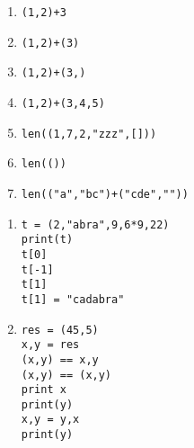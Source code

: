 \begin{multicols}{2}
\begin{multicols}{2}
  \begin{enumerate}[label=\emph{\alph*)}]
    \item \texttt{(1,2)+3}
    \item \texttt{(1,2)+(3)}
    \item \texttt{(1,2)+(3,)}
    \item \texttt{(1,2)+(3,4,5)}
    \item \texttt{len((1,7,2,"zzz",[]))}
    \item \texttt{len(())}
    \item \texttt{len(("a","bc")+("cde",""))}
  \end{enumerate}
\end{multicols}



\begin{enumerate}[label=\emph{\alph*)}]
\item 
\begin{lstlisting}
t = (2,"abra",9,6*9,22)
print(t)
t[0]
t[-1]
t[1]
t[1] = "cadabra" 
\end{lstlisting}
\end{enumerate}

\begin{enumerate}[label=\emph{\alph*)}]
\setcounter{enumi}{1}
\item 
\begin{lstlisting}
res = (45,5)
x,y = res
(x,y) == x,y
(x,y) == (x,y)
print x
print(y)
x,y = y,x
print(y)
\end{lstlisting}
\end{enumerate}



\end{multicols}
